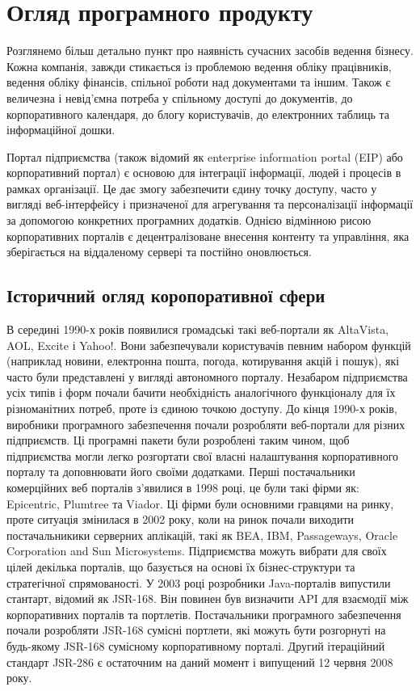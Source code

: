 \section{Огляд програмного продукту}
Розглянемо більш детально пункт про наявність сучасних засобів ведення бізнесу. 
Кожна компанія, завжди стикається із проблемою ведення обліку працівників, ведення обліку фінансів, спільної роботи над документами та іншим.
Також є величезна і невід'ємна потреба у спільному доступі до документів, до корпоративного календаря, до блогу користувачів, до електронних таблиць та інформаційної дошки.
\par Портал підприємства (також відомий як enterprise information portal (EIP) або корпоративний портал) є основою для інтеграції інформації, людей і процесів в рамках організації. 
Це дає змогу забезпечити єдину точку доступу, часто у вигляді веб-інтерфейсу і призначеної для агрегування та персоналізації інформації за допомогою конкретних програмних додатків. Однією відмінною рисою корпоративних порталів є децентралізоване внесення контенту та управління, яка зберігається на віддаленому сервері та постійно оновлюється.
\subsection{Історичний огляд коропоративної сфери}
В середині 1990-х років появилися громадські такі веб-портали як AltaVista, AOL, Excite і Yahoo!. 
Вони забезпечували користувачів певним набором функцій (наприклад новини, електронна пошта, погода, котирування акцій і пошук), які часто були представлені у вигляді автономного порталу.
Незабаром підприємства усіх типів і форм почали бачити необхідність аналогічного функціоналу для їх різноманітних потреб, проте із єдиною точкою доступу.
До кінця 1990-х років, виробники програмного забезпечення почали розробляти веб-портали для різних підприємств. 
Ці програмні пакети були розроблені таким чином, щоб підприємства могли легко розгортати свої власні налаштування корпоративного порталу та доповнювати його своїми додатками.
Перші постачальники комерційних веб порталів з'явилися в 1998 році, це були такі фірми як: Epicentric, Plumtree  та Viador. 
Ці фірми були основними гравцями на ринку, проте ситуація змінилася в 2002 року, коли на ринок почали виходити постачальникики серверних аплікацій, такі як BEA, IBM, Passageways, Oracle Corporation and Sun Microsystems.
Підприємства можуть вибрати для своїх цілей декілька порталів, що базується на основі їх бізнес-структури та стратегічної спрямованості.
У 2003 році розробники Java-порталів випустили стантарт, відомий як JSR-168. 
Він повинен був визначити API для взаємодії між корпоративних порталів та портлетів.
Постачальники програмного забезпечення почали розробляти JSR-168 сумісні портлети, які можуть бути розгорнуті на будь-якому JSR-168 сумісному корпоративному порталі. 
Другий ітераційний стандарт JSR-286 є остаточним на даний момент і випущений 12 червня 2008 року.


